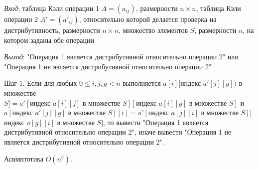 \documentclass[spec, och, labwork]{shiza}
\begin{document}
\begin{enumerate}
                \textit{Вход}: таблица Кэли операции 1 $A = (a_{ij})$, размерности $n \times n$, таблица Кэли операции 2 $A' = (a'_{ij})$, относительно
                которой делается проверка на дистрибутивность, размерности $n \times n$, множество элементов $S$, размерности $n$, на котором заданы обе операции

                \textit{Выход}: "Операция 1 является дистрибутивной относительно операции 2" или "Операция 1 не является дистрибутивной относительно операции 2"

                Шаг 1. Если для любых $0 \leq i, j, g < n$ выполняется $a[i][\text{индекс }a'[j][g])$ в множестве $S] =
                a'[\text{индекс }a[i][j] \text{ в множестве } S][\text{индекс }a[i][g] \text{ в множестве } S]$
                и $a[\text{индекс }a'[j][g] \text{ в множестве } S][i] =
                a'[\text{индекс }a[j][i] \text{ в множестве } S][$индекс $a[g][i] \text{ в множестве } S]$, то вывести "Операция 1 является дистрибутивной относительно операции 2",
                иначе вывести "Операция 1 не является дистрибутивной относительно операции 2".

                Асимптотика $O(n^3)$.
            \end{enumerate}
\end{document}
